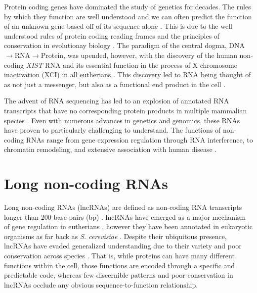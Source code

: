 Protein coding genes have dominated the study of genetics for decades. The rules by which they function are well understood and we can often predict the function of an unknown gene based off of its sequence alone \cite{Whisstock2003PredictionStructure}. This is due to the well understood rules of protein coding reading frames and the principles of conservation in evolutionay biology \cite{Burge1997PredictionDNA,Altschul1990BasicTool,Wheeler2013Nhmmer:HMMs}. The paradigm of the central dogma, DNA $\rightarrow$RNA$\rightarrow$Protein, was upended, however, with the discovery of the human non-coding \emph{XIST} RNA  and its essential function in the process of X chromosome inactivation (XCI) in all eutherians \cite{Brown10TheNucleus.,Brockdorff10TheNucleus.}. This discovery led to RNA being thought of as not just a messenger, but also as a functional end product in the cell \cite{Rinn2012GenomeRNAs,Lee2003TheProcessing,Yang2013MALAT-1Regulation,Tripathi2010ThePhosphorylation,Raphael2017IntegratedAdenocarcinoma,Brown10TheNucleus.,Brockdorff10TheNucleus.}. 

The advent of RNA sequencing has led to an explosion of annotated RNA transcripts that have no corresponding protein products in multiple mammalian species \cite{Derrien2012TheExpression,Hon2017AnEnds,Bogu2016ChromatinMouse}. Even with numerous advances in genetics and genomics, these RNAs have proven to particularly challenging to understand. The functions of non-coding RNAs range from gene expression regulation through RNA interference, to chromatin remodeling, and extensive association with human disease \cite{Rinn2012GenomeRNAs,Lee2003TheProcessing,Yang2013MALAT-1Regulation,Tripathi2010ThePhosphorylation,Raphael2017IntegratedAdenocarcinoma,}.
\section{Long non-coding RNAs}
Long non-coding RNAs (lncRNAs) are defined as non-coding RNA transcripts longer than 200 base pairs (bp) \cite{Derrien2012TheExpression}. lncRNAs have emerged as a major mechanism of gene regulation in eutherians \cite{Sarropoulos2019DevelopmentalSpecies,Bogu2016ChromatinMouse,Sauvageau2013MultipleDevelopment}, however they have been annotated in eukaryotic organisms as far back as \emph{S. cerevisiae} \cite{Niederer2017LongCerevisiae}. Despite their ubiquitous presence, lncRNAs have evaded generalized understanding due to their variety and poor conservation across species \cite{Johnsson2014EvolutionaryFunction}. That is, while proteins can have many different functions within the cell, those functions are encoded through a specific and predictable code, whereas few discernible patterns and poor conservation in lncRNAs occlude any obvious sequence-to-function relationship. 


